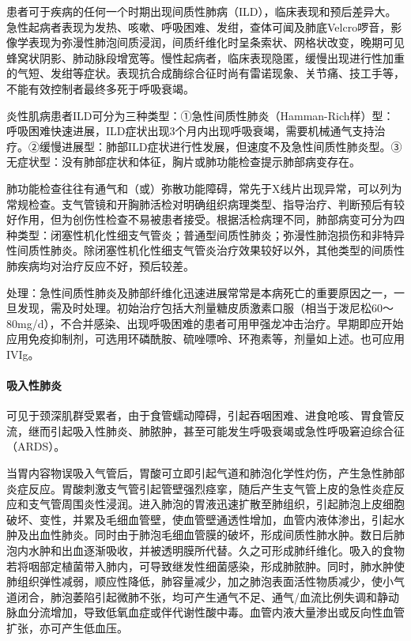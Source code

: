 患者可于疾病的任何一个时期出现间质性肺病（ILD），临床表现和预后差异大。急性起病者表现为发热、咳嗽、呼吸困难、发绀，查体可闻及肺底Velcro啰音，影像学表现为弥漫性肺泡间质浸润，间质纤维化时呈条索状、网格状改变，晚期可见蜂窝状阴影、肺动脉段增宽等。慢性起病者，临床表现隐匿，缓慢出现进行性加重的气短、发绀等症状。表现抗合成酶综合征时尚有雷诺现象、关节痛、技工手等，不能有效控制者最终多死于呼吸衰竭。

炎性肌病患者ILD可分为三种类型：①急性间质性肺炎（Hamman-Rich样）型：呼吸困难快速进展，ILD症状出现3个月内出现呼吸衰竭，需要机械通气支持治疗。②缓慢进展型：肺部ILD症状进行性发展，但速度不及急性间质性肺炎型。③无症状型：没有肺部症状和体征，胸片或肺功能检查提示肺部病变存在。

肺功能检查往往有通气和（或）弥散功能障碍，常先于X线片出现异常，可以列为常规检查。支气管镜和开胸肺活检对明确组织病理类型、指导治疗、判断预后有较好作用，但为创伤性检查不易被患者接受。根据活检病理不同，肺部病变可分为四种类型：闭塞性机化性细支气管炎；普通型间质性肺炎；弥漫性肺泡损伤和非特异性间质性肺炎。除闭塞性机化性细支气管炎治疗效果较好以外，其他类型的间质性肺疾病均对治疗反应不好，预后较差。

处理：急性间质性肺炎及肺部纤维化迅速进展常常是本病死亡的重要原因之一，一旦发现，需及时处理。初始治疗包括大剂量糖皮质激素口服（相当于泼尼松60～80mg/d），不合并感染、出现呼吸困难的患者可用甲强龙冲击治疗。早期即应开始应用免疫抑制剂，可选用环磷酰胺、硫唑嘌呤、环孢素等，剂量如上述。也可应用IVIg。

\paragraph{吸入性肺炎}

可见于颈深肌群受累者，由于食管蠕动障碍，引起吞咽困难、进食呛咳、胃食管反流，继而引起吸入性肺炎、肺脓肿，甚至可能发生呼吸衰竭或急性呼吸窘迫综合征（ARDS）。

当胃内容物误吸入气管后，胃酸可立即引起气道和肺泡化学性灼伤，产生急性肺部炎症反应。胃酸刺激支气管引起管壁强烈痉挛，随后产生支气管上皮的急性炎症反应和支气管周围炎性浸润。进入肺泡的胃液迅速扩散至肺组织，引起肺泡上皮细胞破坏、变性，并累及毛细血管壁，使血管壁通透性增加，血管内液体渗出，引起水肿及出血性肺炎。同时由于肺泡毛细血管膜的破坏，形成间质性肺水肿。数日后肺泡内水肿和出血逐渐吸收，并被透明膜所代替。久之可形成肺纤维化。吸入的食物若将咽部定植菌带入肺内，可导致继发性细菌感染，形成肺脓肿。同时，肺水肿使肺组织弹性减弱，顺应性降低，肺容量减少，加之肺泡表面活性物质减少，使小气道闭合，肺泡萎陷引起微肺不张，均可产生通气不足、通气/血流比例失调和静动脉血分流增加，导致低氧血症或伴代谢性酸中毒。血管内液大量渗出或反向性血管扩张，亦可产生低血压。

